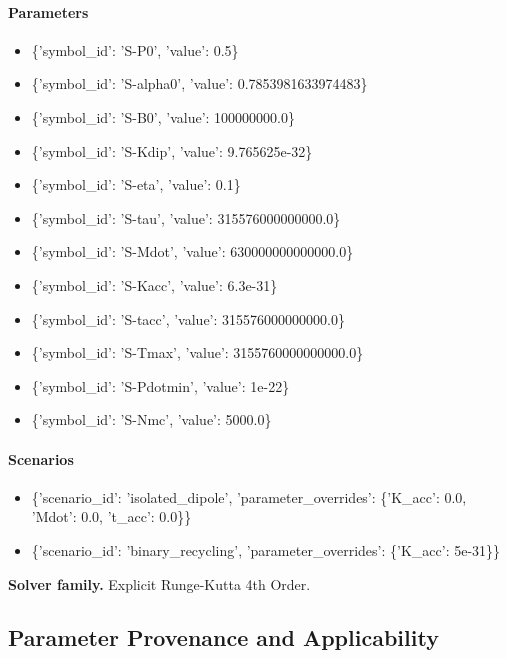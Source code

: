 \documentclass[11pt]{article}
\begin{document}
\paragraph{Parameters}
\begin{itemize}
\item \{'symbol\_id': 'S-P0', 'value': 0.5\}
\item \{'symbol\_id': 'S-alpha0', 'value': 0.7853981633974483\}
\item \{'symbol\_id': 'S-B0', 'value': 100000000.0\}
\item \{'symbol\_id': 'S-Kdip', 'value': 9.765625e-32\}
\item \{'symbol\_id': 'S-eta', 'value': 0.1\}
\item \{'symbol\_id': 'S-tau', 'value': 315576000000000.0\}
\item \{'symbol\_id': 'S-Mdot', 'value': 630000000000000.0\}
\item \{'symbol\_id': 'S-Kacc', 'value': 6.3e-31\}
\item \{'symbol\_id': 'S-tacc', 'value': 315576000000000.0\}
\item \{'symbol\_id': 'S-Tmax', 'value': 3155760000000000.0\}
\item \{'symbol\_id': 'S-Pdotmin', 'value': 1e-22\}
\item \{'symbol\_id': 'S-Nmc', 'value': 5000.0\}
\end{itemize}

\paragraph{Scenarios}
\begin{itemize}
\item \{'scenario\_id': 'isolated\_dipole', 'parameter\_overrides': \{'K\_acc': 0.0, 'Mdot': 0.0, 't\_acc': 0.0\}\}
\item \{'scenario\_id': 'binary\_recycling', 'parameter\_overrides': \{'K\_acc': 5e-31\}\}
\end{itemize}

\noindent\textbf{Solver family.} Explicit Runge-Kutta 4th Order.

\subsection{Parameter Provenance and Applicability}
\end{document}
